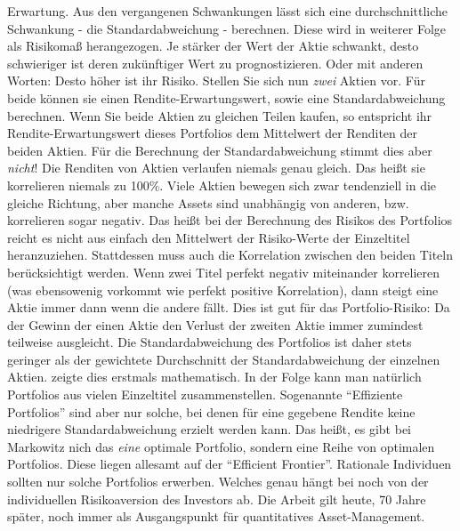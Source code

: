 Erwartung. Aus den vergangenen Schwankungen lässt sich eine durchschnittliche Schwankung - die Standardabweichung - berechnen. Diese wird in weiterer Folge als Risikomaß herangezogen. Je stärker der Wert der Aktie schwankt, desto schwieriger ist deren zukünftiger Wert zu prognostizieren. Oder mit anderen Worten: Desto höher ist ihr Risiko. Stellen Sie sich nun \textit{zwei} Aktien vor. Für beide können sie einen Rendite-Erwartungswert, sowie eine Standardabweichung berechnen. Wenn Sie beide Aktien zu gleichen Teilen kaufen, so entspricht ihr Rendite-Erwartungswert dieses Portfolios dem Mittelwert der Renditen der beiden Aktien. Für die Berechnung der Standardabweichung stimmt dies aber \textit{nicht}! Die Renditen von Aktien verlaufen niemals genau gleich. Das heißt sie korrelieren niemals zu 100\%. Viele Aktien bewegen sich zwar tendenziell in die gleiche Richtung, aber manche Assets sind unabhängig von anderen, bzw. korrelieren sogar negativ. Das heißt bei der Berechnung des Risikos des Portfolios reicht es nicht aus einfach den Mittelwert der Risiko-Werte der Einzeltitel heranzuziehen. Stattdessen muss auch die Korrelation zwischen den beiden Titeln berücksichtigt werden. Wenn zwei Titel perfekt negativ miteinander korrelieren (was ebensowenig vorkommt wie perfekt positive Korrelation), dann steigt eine Aktie immer dann wenn die andere fällt. Dies ist gut für das Portfolio-Risiko: Da der Gewinn der einen Aktie den Verlust der zweiten Aktie immer zumindest teilweise ausgleicht. Die Standardabweichung des Portfolios ist daher stets geringer als der gewichtete Durchschnitt der Standardabweichung der einzelnen Aktien. \textcite{Markowitz1952} zeigte dies erstmals mathematisch. In der Folge kann man natürlich Portfolios aus vielen Einzeltitel zusammenstellen. Sogenannte "`Effiziente Portfolios"' sind aber nur solche, bei denen für eine gegebene Rendite keine niedrigere Standardabweichung erzielt werden kann. Das heißt, es gibt bei Markowitz nich das \textit{eine} optimale Portfolio, sondern eine Reihe von optimalen Portfolios. Diese liegen allesamt auf der "`Efficient Frontier"'. Rationale Individuen sollten nur solche Portfolios erwerben. Welches genau hängt bei \textcite{Markowitz1952} noch von der individuellen Risikoaversion des Investors ab. Die Arbeit gilt heute, 70 Jahre später, noch immer als Ausgangspunkt für quantitatives Asset-Management. 


